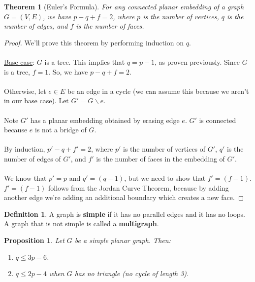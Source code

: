 \documentclass[]{article}
\newtheorem*{theorem}{Theorem}
\newtheorem*{proposition}{Proposition}
\theoremstyle{definition}
\newtheorem*{defn}{Definition}
\newcommand{\lecture}[1]{\marginpar{{\footnotesize $\leftarrow$ \underline{#1}}}}
\begin{document}
			\begin{theorem}[Euler's Formula]
				For any connected planar embedding of a graph $G = (V, E)$, we have $p - q + f = 2$, where $p$ is the number of vertices, $q$ is the number of edges, and $f$ is the number of faces.
			\end{theorem}

			\begin{proof}
				We'll prove this theorem by performing induction on $q$.
				\\ \\
				\underline{Base case}: $G$ is a tree. This implies that $q = p - 1$, as proven previously. Since $G$ is a tree, $f = 1$. So, we have $p - q + f = 2$.
				\\ \\
				Otherwise, let $e \in E$ be an edge in a cycle (we can assume this because we aren't in our base case). Let $G' = G \backslash e$.
				\\ \\
				Note $G'$ has a planar embedding obtained by erasing edge $e$. $G'$ is connected because $e$ is not a bridge of $G$.
				\\ \\
				By induction, $p' - q + f' = 2$, where $p'$ is the number of vertices of $G'$, $q'$ is the number of edges of $G'$, and $f'$ is the number of faces in the embedding of $G'$.
				\\ \\
				We know that $p' = p$ and $q' = (q - 1)$, but we need to show that $f' = (f - 1)$. $f' = (f - 1)$ follows from the Jordan Curve Theorem, because by adding another edge we're adding an additional boundary which creates a new face.
			\end{proof}
			
			\begin{defn} \lecture{March 15, 2013}
				A graph is \textbf{simple} if it has no parallel edges and it has no loops. A graph that is not simple is called a \textbf{multigraph}.
			\end{defn}

			\begin{proposition}
				Let $G$ be a simple planar graph. Then:
				\begin{enumerate}
					\item $q \le 3p - 6$.
					\item $q \le 2p - 4$ when $G$ has no triangle (no cycle of length 3).
				\end{enumerate}
			\end{proposition}
\end{document}
